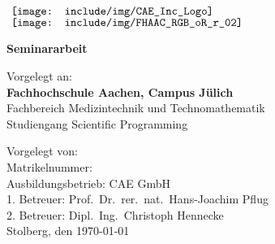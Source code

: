 \pagestyle{empty}

$\vcenter{
	\hbox{
		\texttt{[image: include/img/CAE\_Inc\_Logo]}
	}
}$\hfill{}
$\vcenter{
	\hbox{
		\texttt{[image: include/img/FHAAC\_RGB\_oR\_r\_02]}
	}
}$

\vfill{}

\begin{center}
	\textbf{\LARGE{}{Seminararbeit}}{\LARGE{} }{\LARGE\par}
\end{center}

\vfill{}

\begin{center}
	\textbf{\LARGE{}{\Titel}}{\LARGE{} }{\LARGE\par}
\end{center}

\vfill{}

\begin{flushleft}
	Vorgelegt an:\\
	\textbf{Fachhochschule Aachen, Campus Jülich}\\
	Fachbereich Medizintechnik und Technomathematik\\
	Studiengang Scientific Programming
\end{flushleft}

\begin{flushleft}
	Vorgelegt von: \Name\\
	Matrikelnummer: \Matrikelnummer\\
	Ausbildungsbetrieb: CAE GmbH\\
	1. Betreuer: Prof.\ Dr.\ rer.\ nat.\ Hans-Joachim Pflug\\
	2. Betreuer: Dipl.\ Ing.\ Christoph Hennecke\\
	\vfill{}
	Stolberg, den \today
\end{flushleft}